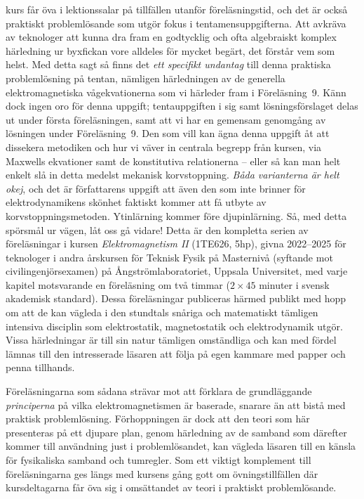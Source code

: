{  kurs f{\aa}r {\"o}va i lektionssalar p{\aa} tillf{\"a}llen utanf{\"o}r
  f{\"o}rel{\"a}sningstid, och det {\"a}r ocks{\aa} praktiskt probleml{\"o}sande
  som utg{\"o}r fokus i tentamensuppgifterna. Att avkr{\"a}va av teknologer att
  kunna dra fram en godtycklig och ofta algebraiskt komplex h{\"a}rledning ur
  byxfickan vore alldeles f{\"o}r mycket beg{\"a}rt, det f{\"o}rst{\aa}r vem
  som helst.
  \bigskip{}\medskip\noindent
  Med detta sagt s{\aa} finns det {\it ett specifikt undantag} till denna
  praktiska probleml{\"o}sning p{\aa} tentan, n{\"a}mligen h{\"a}rledningen
  av de generella elektromagnetiska v{\aa}gekvationerna som vi h{\"a}rleder
  fram i F{\"o}rel{\"a}sning~9. K{\"a}nn dock ingen oro f{\"o}r denna uppgift;
  tentauppgiften i sig samt l{\"o}sningsf{\"o}rslaget delas ut under f{\"o}rsta
  f{\"o}rel{\"a}sningen, samt att vi har en gemensam genomg{\aa}ng av
  l{\"o}sningen under F{\"o}rel{\"a}sning~9.
  Den som vill kan {\"a}gna denna uppgift {\aa}t att dissekera metodiken och
  hur vi v{\"a}ver in centrala begrepp fr{\aa}n kursen, via Maxwells ekvationer
  samt de konstitutiva relationerna -- eller s{\aa} kan man helt enkelt sl{\aa}
  in detta medelst mekanisk korvstoppning. {\it B{\aa}da varianterna {\"a}r helt
  okej}, och det {\"a}r f{\"o}rfattarens uppgift att {\"a}ven den som inte
  brinner f{\"o}r elektrodynamikens sk{\"o}nhet faktiskt kommer att f{\aa}
  utbyte av korvstoppningsmetoden.
  Ytinl{\"a}rning kommer f{\"o}re djupinl{\"a}rning.
  S{\aa}, med detta sp{\"o}rsm{\aa}l ur v{\"a}gen, l{\aa}t oss g{\aa} vidare!
  \bigskip{}\medskip\noindent
  Detta {\"a}r den kompletta serien av f{\"o}rel{\"a}sningar i kursen
  {\it Elektromagnetism II} (1TE626, 5hp), givna 2022--2025 f{\"o}r teknologer
  i andra {\aa}rskursen f{\"o}r Teknisk Fysik p{\aa} Masterniv{\aa} (syftande
  mot civilingenj{\"o}rsexamen) p{\aa} {\AA}ngstr{\"o}mlaboratoriet, Uppsala
  Universitet, med varje kapitel motsvarande en f{\"o}rel{\"a}sning om tv{\aa}
  timmar ($2\times45$ minuter i svensk akademisk standard).
  Dessa f{\"o}rel{\"a}sningar publiceras h{\"a}rmed publikt med hopp om att
  de kan v{\"a}gleda i den stundtals sn{\aa}riga och matematiskt t{\"a}mligen
  intensiva disciplin som elektrostatik, magnetostatik och elektrodynamik
  utg{\"o}r.
  Vissa h{\"a}rledningar {\"a}r till sin natur t{\"a}mligen omst{\"a}ndliga
  och kan med f{\"o}rdel l{\"a}mnas till den intresserade l{\"a}saren att
  f{\"o}lja  p{\aa} egen kammare med papper och penna tillhands.

  F{\"o}rel{\"a}sningarna som s{\aa}dana str{\"a}var mot att f{\"o}rklara de
  grundl{\"a}ggande {\it principerna} p{\aa} vilka elektromagnetismen {\"a}r
  baserade, snarare {\"a}n att bist{\aa} med praktisk probleml{\"o}sning.
  F{\"o}rhoppningen {\"a}r dock att den teori som h{\"a}r presenteras p{\aa}
  ett djupare plan, genom h{\"a}rledning av de samband som d{\"a}refter kommer
  till anv{\"a}ndning just i probleml{\"o}sandet, kan v{\"a}gleda l{\"a}saren
  till en k{\"a}nsla f{\"o}r fysikaliska samband och tumregler.
  Som ett viktigt komplement till f{\"o}rel{\"a}sningarna ges l{\"a}ngs med
  kursens g{\aa}ng gott om {\"o}vningstillf{\"a}llen d{\"a}r kursdeltagarna
  f{\aa}r {\"o}va sig i oms{\"a}ttandet av teori i praktiskt probleml{\"o}sande.

}
